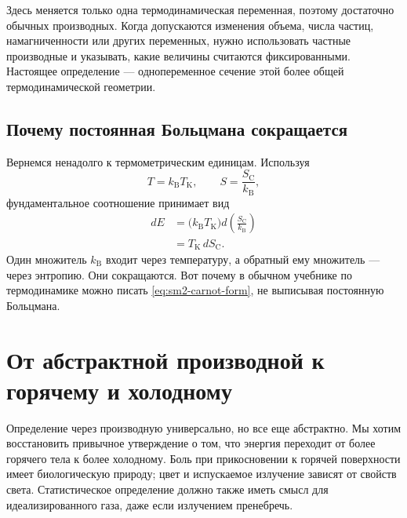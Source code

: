 Здесь меняется только одна термодинамическая переменная, поэтому достаточно обычных производных. Когда допускаются изменения объема, числа частиц, намагниченности или других переменных, нужно использовать частные производные и указывать, какие величины считаются фиксированными. Настоящее определение — однопеременное сечение этой более общей термодинамической геометрии.

\subsection{Почему постоянная Больцмана сокращается}

Вернемся ненадолго к термометрическим единицам. Используя
\[
 T=k_{\mathrm B}T_{\mathrm K},
 \qquad
 S=\frac{S_{\mathrm C}}{k_{\mathrm B}},
\]
фундаментальное соотношение принимает вид
\begin{align}
 dE
 &=\bigl(k_{\mathrm B}T_{\mathrm K}\bigr)
   d\left(\frac{S_{\mathrm C}}{k_{\mathrm B}}\right)\\
 &=T_{\mathrm K}\,dS_{\mathrm C}.
 \label{eq:sm2-carnot-form}
\end{align}
Один множитель \(k_{\mathrm B}\) входит через температуру, а обратный ему множитель — через энтропию. Они сокращаются. Вот почему в обычном учебнике по термодинамике можно писать \eqref{eq:sm2-carnot-form}, не выписывая постоянную Больцмана.

\begin{classroomqa}
\end{classroomqa}

\section{От абстрактной производной к горячему и холодному}

Определение через производную универсально, но все еще абстрактно. Мы хотим восстановить привычное утверждение о том, что энергия переходит от более горячего тела к более холодному. Боль при прикосновении к горячей поверхности имеет биологическую природу; цвет и испускаемое излучение зависят от свойств света. Статистическое определение должно также иметь смысл для идеализированного газа, даже если излучением пренебречь.

